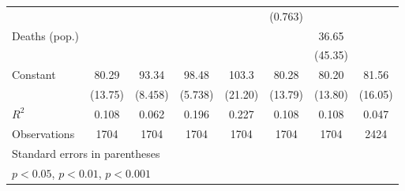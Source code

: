 \documentclass{article}
\begin{document}
{\begin{longtable}{l*{7}{c}}
                &                  &                  &                  &                  &  (0.763)         &                  &                  \\
Deaths (pop.)   &                  &                  &                  &                  &                  &    36.65         &                  \\
                &                  &                  &                  &                  &                  &  (45.35)         &                  \\
Constant        &    80.29\sym{***}&    93.34\sym{***}&    98.48\sym{***}&    103.3\sym{***}&    80.28\sym{***}&    80.20\sym{***}&    81.56\sym{***}\\
                &  (13.75)         &  (8.458)         &  (5.738)         &  (21.20)         &  (13.79)         &  (13.80)         &  (16.05)         \\
\hline
\(R^{2}\)       &    0.108         &    0.062         &    0.196         &    0.227         &    0.108         &    0.108         &    0.047         \\
Observations    &     1704         &     1704         &     1704         &     1704         &     1704         &     1704         &     2424         \\
\hline\hline
\multicolumn{8}{l}{\footnotesize Standard errors in parentheses}\\
\multicolumn{8}{l}{\footnotesize \sym{*} \(p<0.05\), \sym{**} \(p<0.01\), \sym{***} \(p<0.001\)}\\
\end{longtable}
}
\end{document}
